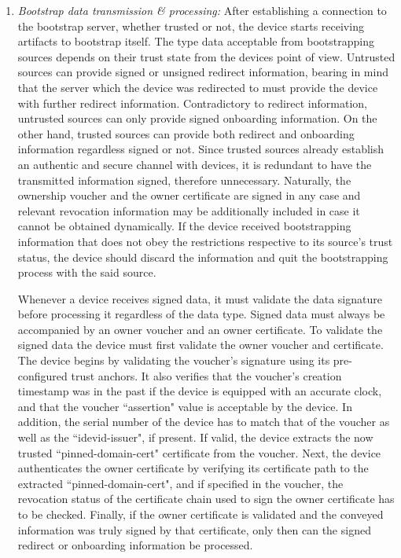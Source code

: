 \begin{enumerate}
	\item \textit{Bootstrap data transmission \& processing:} After establishing a connection to the bootstrap server, whether trusted or not, the device starts receiving artifacts to bootstrap itself. The type data acceptable from bootstrapping sources depends on their trust state from the devices point of view. Untrusted sources can provide signed or unsigned redirect information, bearing in mind that the server which the device was redirected to must provide the device with further redirect information. Contradictory to redirect information, untrusted sources can only provide signed onboarding information. On the other hand, trusted sources can provide both redirect and onboarding information regardless signed or not. Since trusted sources already establish an authentic and secure channel with devices, it is redundant to have the transmitted information signed, therefore unnecessary. Naturally, the ownership voucher and the owner certificate are signed in any case and relevant revocation information may be additionally included in case it cannot be obtained dynamically. If the device received bootstrapping information that does not obey the restrictions respective to its source's trust status, the device should discard the information and quit the bootstrapping process with the said source.
	\par
	Whenever a device receives signed data, it must validate the data signature before processing it regardless of the data type. Signed data must always be accompanied by an owner voucher and an owner certificate. To validate the signed data the device must first validate the owner voucher and certificate. The device begins by validating the voucher's signature using its pre-configured trust anchors. It also verifies that the voucher's creation timestamp was in the past if the device is equipped with an accurate clock, and that the voucher ``assertion" value is acceptable by the device. In addition, the serial number of the device has to match that of the voucher as well as the ``idevid-issuer", if present. If valid, the device extracts the now trusted ``pinned-domain-cert" certificate from the voucher. Next, the device authenticates the owner certificate by verifying its certificate path to the extracted ``pinned-domain-cert", and if specified in the voucher, the revocation status of the certificate chain used to sign the owner certificate has to be checked. Finally, if the owner certificate is validated and the conveyed information was truly signed by that certificate, only then can the signed redirect or onboarding information be processed.

\end{enumerate}
